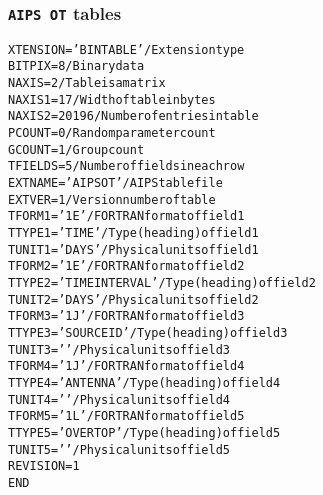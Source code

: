 \documentclass[twoside]{article}
\begin{document}
\subsubsection{{\tt AIPS OT} tables}
\label{Appe:OTtable}
\begin{alltt}
XTENSION= 'BINTABLE'           / Extension type
BITPIX  =                    8 / Binary data
NAXIS   =                    2 / Table is a matrix
NAXIS1  =                   17 / Width of table in bytes
NAXIS2  =                20196 / Number of entries in table
PCOUNT  =                    0 / Random parameter count
GCOUNT  =                    1 / Group count
TFIELDS =                    5 / Number of fields in each row
EXTNAME = 'AIPS OT '           / AIPS table file
EXTVER  =                    1 / Version number of table
TFORM1  = '1E      '           / FORTRAN format of field  1
TTYPE1  = 'TIME            '   / Type (heading) of field  1
TUNIT1  = 'DAYS    '           / Physical units of field  1
TFORM2  = '1E      '           / FORTRAN format of field  2
TTYPE2  = 'TIME INTERVAL   '   / Type (heading) of field  2
TUNIT2  = 'DAYS    '           / Physical units of field  2
TFORM3  = '1J      '           / FORTRAN format of field  3
TTYPE3  = 'SOURCE ID       '   / Type (heading) of field  3
TUNIT3  = '        '           / Physical units of field  3
TFORM4  = '1J      '           / FORTRAN format of field  4
TTYPE4  = 'ANTENNA         '   / Type (heading) of field  4
TUNIT4  = '        '           / Physical units of field  4
TFORM5  = '1L      '           / FORTRAN format of field  5
TTYPE5  = 'OVER TOP        '   / Type (heading) of field  5
TUNIT5  = '        '           / Physical units of field  5
REVISION=            1
END
\end{alltt}
\end{document}
